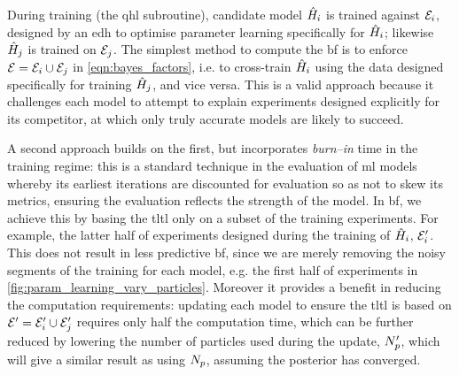 During training (the \gls{qhl} subroutine), candidate model $\hat{H}_i$ is trained against ${ \mathcal{E} }_i$, 
    designed by an \gls{edh} to optimise parameter learning specifically for $\hat{H}_i$;
    likewise $\hat{H}_j$ is trained on ${ \mathcal{E} }_j$. 
The simplest method to compute the \gls{bf} is to enforce ${ \mathcal{E} }={ \mathcal{E} }_i \cup { \mathcal{E} }_j$ 
    in \cref{eqn:bayes_factors}, i.e. to cross-train $\hat{H}_i$ using the data designed specifically for training $\hat{H}_j$, 
    and vice versa. 
This is a valid approach because it challenges each model to attempt to explain experiments
    designed explicitly for its competitor,   
    at which only truly accurate models are likely to succeed. 
\par 
A second approach builds on the first, but incorporates \emph{burn--in} time in the training regime:
    this is a standard technique in the evaluation of \gls{ml} models whereby its earliest iterations 
    are discounted for evaluation so as not to skew its metrics, 
    ensuring the evaluation reflects the strength of the model. 
In \gls{bf}, we achieve this by basing the \gls{tltl} only on a subset of the training experiments. 
For example, the latter half of experiments designed during the training of $\hat{H}_i$, ${ \mathcal{E} }_i^{\prime}$. 
This does not result in less predictive \gls{bf}, since we are merely removing the 
    noisy segments of the training for each model, e.g. the first half of experiments in \cref{fig:param_learning_vary_particles}. 
Moreover it provides a benefit in reducing the computation requirements: 
    updating each model to ensure the \gls{tltl} is based on ${ \mathcal{E} }^{\prime}={ \mathcal{E} }_i^{\prime} \cup { \mathcal{E} }_j^{\prime}$
    requires only half the computation time, 
    which can be further reduced by lowering the number of particles used during the update, $N_p^{\prime}$, 
    which will give a similar result as using $N_p$, assuming the posterior has converged.
\par 

